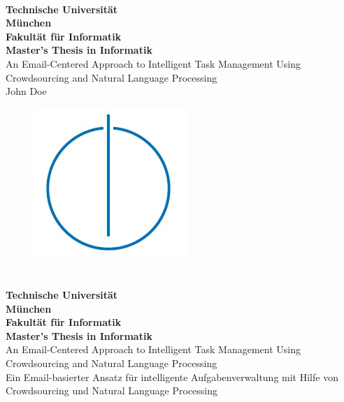 \documentclass[12pt,oneside, reqno]{report}
\begin{document}
\nocite{*} %
\hoffset=5mm
\thispagestyle{empty}

\begin{center}
	\bigskip \bigskip \bigskip 
	\oTUM{6.0cm} \\
	\vspace*{0.8cm}
	{\huge \bf Technische Universität} \\
	\bigskip
	{\huge \bf München} \\
	\bigskip \bigskip \bigskip
	{\huge \bf Fakultät für Informatik} \\
	\bigskip \bigskip \bigskip
	{\Large \bf Master's Thesis in Informatik} \\
	\bigskip \bigskip \bigskip \bigskip \bigskip
	{\Large An Email-Centered Approach to Intelligent Task Management Using Crowdsourcing and Natural Language Processing} \\        
	\bigskip \bigskip \bigskip \bigskip
	{\Large John Doe} \\    
	\bigskip
	\begin{figure}[ht]
	\centering \includegraphics[width=0.2\linewidth]{figures/infologo.jpg}
	\end{figure}
	\bigskip 
\end{center}

\vfill

\newpage
\hoffset=5mm
\thispagestyle{empty}

\begin{center}
	\bigskip \bigskip \bigskip 
	\oTUM{6.0cm} \\
	\vspace*{0.8cm}
	{\huge \bf Technische Universität} \\
	\bigskip
	{\huge \bf München} \\
	\bigskip \bigskip \bigskip
	{\huge \bf Fakultät für Informatik} \\
	\bigskip \bigskip \bigskip
	{\Large \bf Master's Thesis in Informatik} \\
	\bigskip \bigskip \bigskip \bigskip \bigskip
	{\Large An Email-Centered Approach to Intelligent Task Management Using Crowdsourcing and Natural Language Processing} \\
	\bigskip \bigskip \bigskip
	{\Large Ein Email-basierter Ansatz für intelligente Aufgabenverwaltung mit Hilfe von Crowdsourcing und Natural Language Processing} \\
	\bigskip
\end{center}
\vfill
\end{document}
